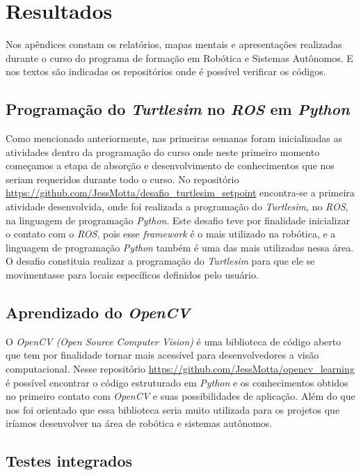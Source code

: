 \chapter{Resultados}
\label{chap:result}
Nos apêndices constam os relatórios, mapas mentais e apresentações realizadas durante o curso do programa de formação em Robótica e Sistemas Autônomos. E nos textos são indicadas os repositórios onde é possível verificar os códigos.

\section{Programação do \textit{Turtlesim} no \textit{ROS} em \textit{Python}}
\label{sec:testu}
Como mencionado anteriormente, nas primeiras semanas foram inicializadas as atividades dentro da programação do curso onde neste primeiro momento começamos a etapa de absorção e desenvolvimento de conhecimentos que nos seriam requeridos durante todo o curso.
No repositório \url{https://github.com/JessMotta/desafio_turtlesim_setpoint} encontra-se a primeira atividade desenvolvida, onde foi realizada a programação do \textit{Turtlesim}, no  \textit{ROS}, na linguagem de programação \textit{Python}. Este desafio teve por finalidade inicializar o contato com o \textit{ROS}, pois esse \textit{framework} é o mais utilizado na robótica, e a linguagem de programação \textit{Python} também é uma das mais utilizadas nessa área.
O desafio constituia realizar a programação do \textit{Turtlesim} para que ele se movimentasse para locais específicos definidos pelo usuário.

\section{Aprendizado do \textit{OpenCV}}
\label{sec:intsis}
O \textit{OpenCV (Open Source Computer Vision)} é uma biblioteca de código aberto que tem por finalidade tornar mais acessível para desenvolvedores a visão computacional. Nesse repositório \url{https://github.com/JessMotta/opencv_learning} é possível encontrar o código estruturado em \textit{Python} e os conhecimentos obtidos no primeiro contato com \textit{OpenCV} e suas possibilidades de aplicação. Além do que nos foi orientado que essa biblioteca seria muito utilizada para os projetos que iríamos desenvolver na área de robótica e sistemas autônomos. 

\section{Testes integrados}
\label{sec:testi}
\lipsum[1]







